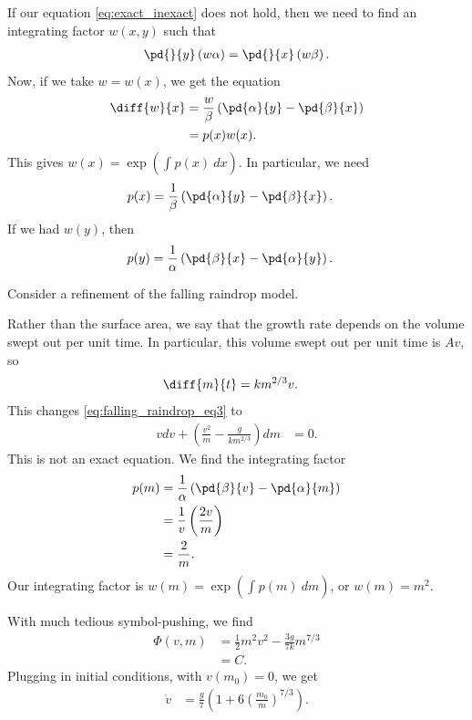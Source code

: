 \documentclass[10pt]{mypackage}
\begin{document}
  \begin{example}
    If our equation \eqref{eq:exact_inexact} does not hold, then we need to find an integrating factor $w\left( x,y \right)$ such that
    \begin{align*}
      \pd{}{y}\left( w\alpha \right) = \pd{}{x}\left( w\beta \right).
    \end{align*}
    Now, if we take $w = w(x)$, we get the equation
    \begin{align*}
      \diff{w}{x} &= \frac{w}{\beta}\left( \pd{\alpha}{y} - \pd{\beta}{x} \right)\\
                  &= p(x)w(x).
    \end{align*}
    This gives $w(x) = \exp\left( \int_{}^{} p(x)\:dx \right)$. In particular, we need
    \begin{align*}
      p(x) &= \frac{1}{\beta}\left( \pd{\alpha}{y} - \pd{\beta}{x} \right).
    \end{align*}
    If we had $w(y)$, then
    \begin{align*}
      p(y) &= \frac{1}{\alpha}\left( \pd{\beta}{x} - \pd{\alpha}{y} \right).
    \end{align*}
  \end{example}
  \begin{example}
    Consider a refinement of the falling raindrop model.\newline

    Rather than the surface area, we say that the growth rate depends on the volume swept out per unit time. In particular, this volume swept out per unit time is $Av$, so
    \begin{align*}
      \diff{m}{t} &= km^{2/3} v.
    \end{align*}
    This changes \eqref{eq:falling_raindrop_eq3} to
    \begin{align*}
      v dv + \left( \frac{v^2}{m} - \frac{g}{km^{2/3}} \right) dm &= 0.
    \end{align*}
    This is not an exact equation. We find the integrating factor
    \begin{align*}
      p(m) &= \frac{1}{\alpha}\left( \pd{\beta}{v} - \pd{\alpha}{m} \right)\\
           &= \frac{1}{v}\left( \frac{2v}{m} \right)\\
           &= \frac{2}{m}.
    \end{align*}
    Our integrating factor is $w(m) = \exp\left( \int_{}^{} p(m)\:dm \right)$, or $w(m) = m^2$.\newline

    With much tedious symbol-pushing, we find
    \begin{align*}
      \Phi(v,m) &= \frac{1}{2}m^2v^2 - \frac{3g}{7k}m^{7/3}\\
                &= C.
    \end{align*}
    Plugging in initial conditions, with $v\left( m_0 \right)= 0$, we get
    \begin{align*}
      \dot{v} &= \frac{g}{7}\left( 1 + 6\left( \frac{m_0}{m} \right)^{7/3} \right).
    \end{align*}
  \end{example}
\end{document}
